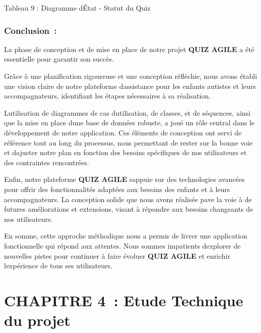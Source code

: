 \documentclass[12pt,a4paper,twoside]{report}
\begin{document}
\protect\hypertarget{_Toc203823483}{}{}Tableau 9 : Diagramme
d\textquotesingle État - Statut du Quiz

\hypertarget{conclusion-2}{%
\subsubsection{\texorpdfstring{\textbf{Conclusion}~:}{Conclusion~:}}\label{conclusion-2}}

La phase de conception et de mise en place de notre projet \textbf{QUIZ
AGILE} a été essentielle pour garantir son succès.

Grâce à une planification rigoureuse et une conception réfléchie, nous
avons établi une vision claire de notre plateforme
d\textquotesingle assistance pour les enfants autistes et leurs
accompagnateurs, identifiant les étapes nécessaires à sa réalisation.

L\textquotesingle utilisation de diagrammes de cas
d\textquotesingle utilisation, de classes, et de séquences, ainsi que la
mise en place d\textquotesingle une base de données robuste, a joué un
rôle central dans le développement de notre application. Ces éléments de
conception ont servi de référence tout au long du processus, nous
permettant de rester sur la bonne voie et d\textquotesingle ajuster
notre plan en fonction des besoins spécifiques de nos utilisateurs et
des contraintes rencontrées.

Enfin, notre plateforme \textbf{QUIZ AGILE} s\textquotesingle appuie sur
des technologies avancées pour offrir des fonctionnalités adaptées aux
besoins des enfants et à leurs accompagnateurs. La conception solide que
nous avons réalisée pave la voie à de futures améliorations et
extensions, visant à répondre aux besoins changeants de nos
utilisateurs.

En somme, cette approche méthodique nous a permis de livrer une
application fonctionnelle qui répond aux attentes. Nous sommes
impatients d\textquotesingle explorer de nouvelles pistes pour continuer
à faire évoluer \textbf{QUIZ AGILE} et enrichir
l\textquotesingle expérience de tous ses utilisateurs.

\hypertarget{section-5}{%
\section{}\label{section-5}}

\hypertarget{chapitre-4-etude-technique-du-projet}{%
\section{CHAPITRE 4~: Etude Technique du
projet}\label{chapitre-4-etude-technique-du-projet}}
\end{document}
